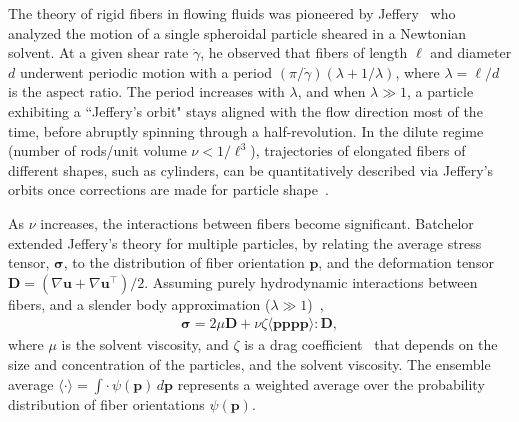 \documentclass[preprint, 10pt]{elsarticle}
\begin{document}
The theory of rigid fibers in flowing fluids was pioneered by
Jeffery~\cite{Jeffery1922} who analyzed the motion of a single
spheroidal particle sheared in a Newtonian solvent. At a given shear
rate $\dot{\gamma}$, he observed that fibers of length $\ell$ and
diameter $d$ underwent periodic motion with a period $(\pi/\dot{\gamma})
(\lambda + 1/\lambda)$, where $\lambda = \ell/d$ is the aspect ratio.
The period increases with $\lambda$, and when $\lambda \gg 1$, a
particle exhibiting a ``Jeffery's orbit" stays aligned with the flow
direction most of the time, before abruptly spinning through a
half-revolution. In the dilute regime (number of rods/unit volume $\nu <
1/\ell^3$), trajectories of elongated fibers of different shapes, such
as cylinders, can be quantitatively described via Jeffery's orbits once
corrections are made for particle shape~\cite{Bretherton1962}.

As $\nu$ increases, the interactions between fibers become significant.
Batchelor extended Jeffery's theory for multiple particles, by relating
the average stress tensor, ${\bm \sigma}$, to the distribution of fiber
orientation $\mathbf{p}$, and the deformation tensor $\mathbf{D} =
(\nabla \mathbf{u} + \nabla \mathbf{u}^\intercal)/2$. Assuming purely
hydrodynamic interactions between fibers, and a slender body
approximation ($\lambda \gg 1$)~\cite{Batchelor1970, Batchelor1970a,
Doi1978, Dinh1984, Shaqfeh1990},
\begin{align}
  {\bm \sigma} = 2 \mu \mathbf{D} + \nu \zeta 
    \langle \mathbf{p p p p} \rangle : \mathbf{D},
\label{eqn:batchelor}
\end{align}
where $\mu$ is the solvent viscosity, and $\zeta$ is a drag
coefficient~\cite{Batchelor1971} that depends on the size and
concentration of the particles, and the solvent viscosity. The ensemble
average $\langle \cdot \rangle = \int \cdot \,
\psi(\mathbf{p})\,d\mathbf{p}$ represents a weighted average over the
probability distribution of fiber orientations $\psi(\mathbf{p})$. 
\end{document}
